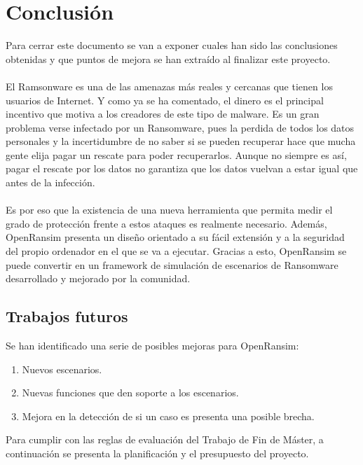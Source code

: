 \documentclass[a4paper,12pt]{article}
\begin{document}
\section{Conclusión}
Para cerrar este documento se van a exponer cuales han sido las conclusiones obtenidas y que puntos de mejora se han extraído al finalizar este proyecto.\\\\
El Ramsonware es una de las amenazas más reales y cercanas que tienen los usuarios de Internet. Y como ya se ha comentado, el dinero es el principal incentivo que motiva a los creadores de este tipo de malware. Es un gran problema verse infectado por un Ransomware, pues la perdida de todos los datos personales y la incertidumbre de no saber si se pueden recuperar hace que mucha gente elija pagar un rescate para poder recuperarlos. Aunque no siempre es así, pagar el rescate por los datos no garantiza que los datos vuelvan a estar igual que antes de la infección. \\\\
Es por eso que la existencia de una nueva herramienta que permita medir el grado de protección frente a estos ataques es realmente necesario. Además, OpenRansim presenta un diseño orientado a su fácil extensión y a la seguridad del propio ordenador en el que se va a ejecutar. Gracias a esto, OpenRansim se puede convertir en un framework de simulación de escenarios de Ransomware desarrollado y mejorado por la comunidad.
\subsection{Trabajos futuros}
Se han identificado una serie de posibles mejoras para OpenRansim:
\begin{enumerate}
	\item Nuevos escenarios.
	\item Nuevas funciones que den soporte a los escenarios.
	\item Mejora en la detección de si un caso es presenta una posible brecha.
\end{enumerate}
\newpage
\appendix
Para cumplir con las reglas de evaluación del Trabajo de Fin de Máster, a continuación se presenta la planificación y el presupuesto del proyecto.
\end{document}
